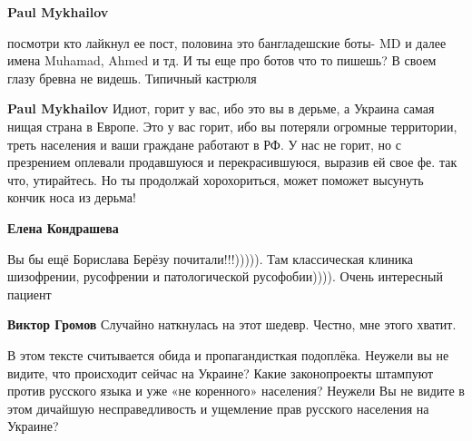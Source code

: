 \begin{itemize}
\begin{itemize}
\textbf{Paul Mykhailov} 

посмотри кто лайкнул ее пост, половина это бангладешские боты- MD и далее имена
Muhamad, Ahmed и тд. И ты еще про ботов что то пишешь? В своем глазу бревна не
видешь. Типичный кастрюля

 
\textbf{Paul Mykhailov} Идиот, горит у вас, ибо это вы в дерьме, а Украина самая нищая страна в Европе. Это у вас горит, ибо вы потеряли огромные территории, треть населения и ваши граждане работают в РФ. У нас не горит, но с презрением оплевали продавшуюся и перекрасившуюся, выразив ей свое фе. так что, утирайтесь. Но ты продолжай хорохориться, может поможет высунуть кончик носа из дерьма!

 
\textbf{Елена Кондрашева} 

Вы бы ещё Борислава Берёзу почитали!!!))))). Там классическая клиника
шизофрении, русофрении и патологической русофобии)))). Очень интересный
пациент🤣


 
\textbf{Виктор Громов} Случайно наткнулась на этот шедевр. Честно, мне этого хватит.

\end{itemize}

 

В этом тексте считывается обида и пропагандисткая подоплёка. Неужели вы не
видите, что происходит сейчас на Украине? Какие законопроекты штампуют против
русского языка и уже «не коренного» населения? Неужели Вы не видите в этом
дичайшую несправедливость и ущемление прав русского населения на Украине? 


\end{itemize}
